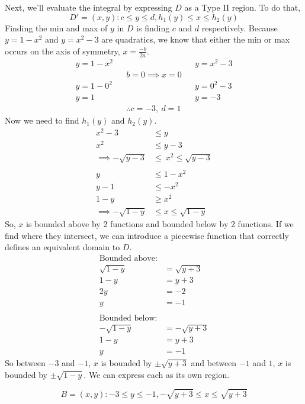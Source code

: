 \documentclass[a4paper,12pt]{report}
\begin{document}
\newpage
Next, we'll evaluate the integral by expressing $D$ as a Type II region. To do that, 
$$
D' = {(x,y) : c \leq y \leq d, h_1(y) \leq x \leq h_2(y)}
$$
Finding the min and max of $y$ in $D$ is finding $c$ and $d$ respectively. Because $y = 1 - x^2$ and $ y = x^2 - 3$ are quadratics, we know that either the min or max occurs on the axis of symmetry, $x = \frac{-b}{2a}$.
\begin{align*}
    y = 1 - x^2 &&&& y = x^2 - 3 \\
    && b=0 \implies x = 0 & \\
    y = 1 - 0^2 &&&& y = 0^2 - 3 \\
    y = 1 &&&& y = -3 \\
    && \therefore c = -3, \ d = 1
\end{align*}
Now we need to find $h_1 (y)$ and $h_2(y)$.
\begin{align*}
    x^2 - 3 &\leq y \\
    x^2 &\leq y - 3 \\
    \implies -\sqrt{y - 3} &\leq \ x^2 \leq \sqrt{y - 3} \\
    \\
    y &\leq 1 - x^2 \\
    y - 1 &\leq -x^2 \\
    1 - y &\geq x^2 \\
    \implies -\sqrt{1 - y} &\leq x \leq \sqrt{1 - y} 
\end{align*}
So, $x$ is bounded above by 2 functions and bounded below by 2 functions. If we find where they intersect, we can introduce a piecewise function that correctly defines an equivalent domain to $D$. 
\begin{align*}
    \text{Bounded above:}\\
    \sqrt{1 - y} &= \sqrt{y + 3} \\
    1 - y &= y + 3 \\
    2y &= -2 \\
    y &= -1 \\ \\
    \text{Bounded below:} \\
    -\sqrt{1 - y} &= -\sqrt{y + 3} \\
    1 - y &= y + 3 \\
    y &= -1
\end{align*}
So between $-3$ and $-1$, $x$ is bounded by $\pm \sqrt{y + 3}$ and between $-1$ and $1$, $x$ is bounded by $\pm \sqrt{1 - y}$. We can express each as its own region.

$$
B = {(x, y): -3 \leq y \leq -1, -\sqrt{y +3} \leq x \leq \sqrt{y + 3}}
$$
\end{document}
